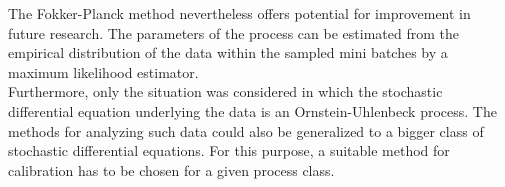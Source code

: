 \documentclass[11pt,titlepage]{article}
\theoremstyle{definition}
\theoremstyle{remark}
\begin{document}
	The Fokker-Planck method nevertheless offers potential for improvement in future research. The parameters of the process can be estimated from the empirical distribution of the data within the sampled mini batches by a maximum likelihood estimator.\\
	Furthermore, only the situation was considered in which the stochastic differential equation underlying the data is an Ornstein-Uhlenbeck process. The methods for analyzing such data could also be generalized to a bigger class of stochastic differential equations. For this purpose, a suitable method for calibration has to be chosen for a given process class.
	
\end{document}
